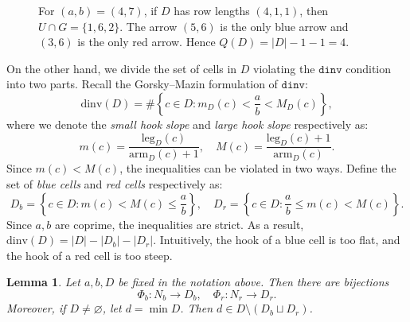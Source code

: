 \documentclass[11pt,reqno]{amsart}
\newtheorem{lemma}[theorem]{Lemma}
\theoremstyle{remark}
\begin{document}
\begin{figure}[h]
    \centering
    \caption{For $(a,b)=(4,7)$, if $D$ has row lengths $(4,1,1)$, then $U\cap G = \{1,6,2\}$. The arrow $(5,6)$ is the only blue arrow and $(3,6)$ is the only red arrow. Hence $Q(D)=|D|-1-1=4$.}
    \label{fig:arrows}
\end{figure}


On the other hand, we divide the set of cells in $D$ violating the $\mathtt{dinv}$ condition into two parts. Recall the Gorsky--Mazin formulation of $\mathtt{dinv}$:
\[
\mathrm{dinv}(D)=\#\left\{c\in D: m_D(c) < \frac{a}{b} < M_D(c)\right\},
\]
where we denote the \emph{small hook slope} and \emph{large hook slope} respectively as:
\[ m(c)=\frac{\mathrm{leg}_D(c)}{\mathrm{arm}_D(c)+1},\quad M(c)=\frac{\mathrm{leg}_D(c)+1}{\mathrm{arm}_D(c)}.\]
Since $m(c)<M(c)$, the inequalities can be violated in two ways.
Define the set of \emph{blue cells} and \emph{red cells} respectively as:
\[ D_b=\left\{ c\in D: m(c)<M(c)\leq \frac{a}{b}\right\}, \quad D_r=\left\{ c\in D: \frac{a}{b}\leq m(c)<M(c)\right\}. \]
Since $a,b$ are coprime, the inequalities are strict. As a result, $\mathrm{dinv}(D)=|D|-|D_b|-|D_r|$. Intuitively, the hook of a blue cell is too flat, and the hook of a red cell is too steep. 

\begin{lemma}\label{lem:main-bijection}
    Let $a,b,D$ be fixed in the notation above. Then there are bijections
    \[ \Phi_b:N_b\to D_b,\quad \Phi_r:N_r\to D_r.\]
    Moreover, if $D\neq \varnothing$, let $d=\min D$. Then $d\in D\setminus(D_b\sqcup D_r)$. 
\end{lemma}
\end{document}
